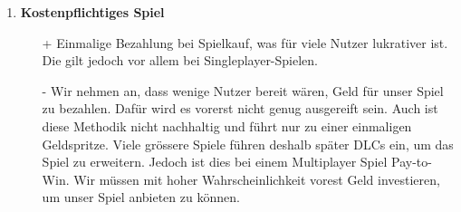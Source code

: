\begin{itemize}
\begin{enumerate}
        \item \textbf{Kostenpflichtiges Spiel}
        \begin{itemize}
            \item[+] Einmalige Bezahlung bei Spielkauf, was für viele Nutzer lukrativer ist. Die gilt jedoch vor allem bei Singleplayer-Spielen.
            \item[-] Wir nehmen an, dass wenige Nutzer bereit wären, Geld für unser Spiel zu bezahlen.
                    Dafür wird es vorerst nicht genug ausgereift sein.
                    Auch ist diese Methodik nicht nachhaltig und führt nur zu einer einmaligen Geldspritze.
                    Viele grössere Spiele führen deshalb später
                    DLCs ein, um das Spiel zu erweitern.
                    Jedoch ist dies bei einem Multiplayer Spiel Pay-to-Win.
                    Wir müssen mit hoher Wahrscheinlichkeit vorest Geld investieren, um unser Spiel anbieten zu können.
        \end{itemize}
    \end{enumerate}
\end{itemize}

